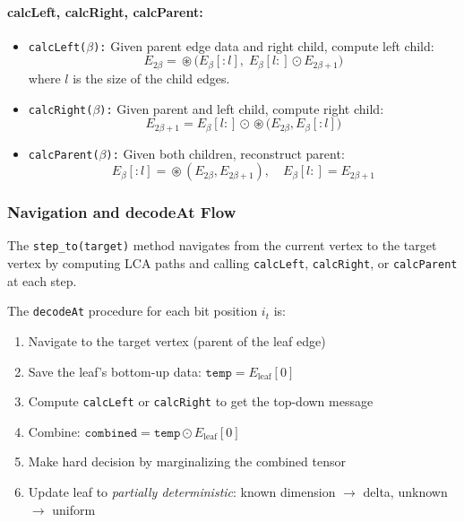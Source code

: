 \documentclass[11pt,a4paper]{article}
\DeclareMathOperator{\circconv}{\circledast}
\begin{document}
\paragraph{calcLeft, calcRight, calcParent:}
\begin{itemize}
  \item \texttt{calcLeft($\beta$):} Given parent edge data and right child, compute left child:
  \begin{equation}
    E_{2\beta} = \circconv\bigl(E_\beta[:l], \; E_\beta[l:] \odot E_{2\beta+1}\bigr)
  \end{equation}
  where $l$ is the size of the child edges.

  \item \texttt{calcRight($\beta$):} Given parent and left child, compute right child:
  \begin{equation}
    E_{2\beta+1} = E_\beta[l:] \odot \circconv\bigl(E_{2\beta}, E_\beta[:l]\bigr)
  \end{equation}

  \item \texttt{calcParent($\beta$):} Given both children, reconstruct parent:
  \begin{equation}
    E_\beta[:l] = \circconv(E_{2\beta}, E_{2\beta+1}), \quad E_\beta[l:] = E_{2\beta+1}
  \end{equation}
\end{itemize}

\subsubsection{Navigation and decodeAt Flow}

The \texttt{step\_to(target)} method navigates from the current vertex to
the target vertex by computing LCA paths and calling \texttt{calcLeft},
\texttt{calcRight}, or \texttt{calcParent} at each step.

The \texttt{decodeAt} procedure for each bit position $i_t$ is:
\begin{enumerate}
  \item Navigate to the target vertex (parent of the leaf edge)
  \item Save the leaf's bottom-up data: $\texttt{temp} = E_{\text{leaf}}[0]$
  \item Compute \texttt{calcLeft} or \texttt{calcRight} to get the top-down message
  \item Combine: $\texttt{combined} = \texttt{temp} \odot E_{\text{leaf}}[0]$
  \item Make hard decision by marginalizing the combined tensor
  \item Update leaf to \emph{partially deterministic}: known dimension $\to$ delta, unknown $\to$ uniform
\end{enumerate}
\end{document}
